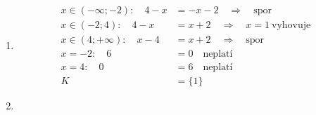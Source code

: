 \documentclass[11pt,a4paper]{article}
\begin{document}
\begin{zadaniReseniBox}[title={Domácí úkol}]
\begin{enumerate}[label=\alph*),itemsep=1pt]
\begin{center}
{\begin{tabular}{@{}lccc@{}}
$|x + 1|$ & $-(x + 1)$ & $+(x + 1)$ & $+(x + 1)$ \\
\midrule
Rovnice & $-(x - 5)-(x + 1)=10$ & $-(x - 5)+(x + 1)=10$ & $+(x - 5)+(x + 1)=10$ \\
\bottomrule
\end{tabular}}
\endgroup
\end{center}
\[\begin{aligned}x\in (-\infty;-1):\quad 4 - 2 x &= 10\quad\Longrightarrow\quad x=-3\ \text{vyhovuje}\\[2pt]
x\in (-1;5):\quad 6 &= 10\quad\Longrightarrow\quad \text{spor}\\[2pt]
x\in (5;+\infty):\quad 2 x - 4 &= 10\quad\Longrightarrow\quad x=7\ \text{vyhovuje}\\[2pt]
x=-1:\quad 6 &= 10\quad\text{neplatí}\\[2pt]
x=5:\quad 6 &= 10\quad\text{neplatí}\\[2pt]
K&=\{-3;7\}\end{aligned}\]
\item
\begin{center}
\begingroup\footnotesize
\renewcommand{\arraystretch}{1.32}
\endgroup
\end{center}
\[\begin{aligned}x\in (-\infty;-2):\quad 4 - x &= - x - 2\quad\Longrightarrow\quad \text{spor}\\[2pt]
x\in (-2;4):\quad 4 - x &= x + 2\quad\Longrightarrow\quad x=1\ \text{vyhovuje}\\[2pt]
x\in (4;+\infty):\quad x - 4 &= x + 2\quad\Longrightarrow\quad \text{spor}\\[2pt]
x=-2:\quad 6 &= 0\quad\text{neplatí}\\[2pt]
x=4:\quad 0 &= 6\quad\text{neplatí}\\[2pt]
K&=\{1\}\end{aligned}\]
\item
\begin{center}
\begingroup\footnotesize

\end{center}
\end{enumerate}
\end{zadaniReseniBox}
\end{document}
